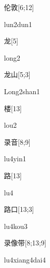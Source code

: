 \begin{verbete}{伦敦}[6;12]
\begin{pronuncia}{lun2dun1}
\end{pronuncia}
\end{verbete}

\begin{verbete}[long2]{龙}[5]
\begin{pronuncia}{long2}
\end{pronuncia}
\end{verbete}

\begin{verbete}{龙山}[5;3]
\begin{pronuncia}{Long2shan1}
\end{pronuncia}
\end{verbete}

\begin{verbete}[lou2]{楼}[13]
\begin{pronuncia}{lou2}
\end{pronuncia}
\end{verbete}

\begin{verbete}[lu4yin1]{录音}[8;9]
\begin{pronuncia}{lu4yin1}
\end{pronuncia}
\end{verbete}

\begin{verbete}[lu4]{路}[13]
\begin{pronuncia}{lu4}
\end{pronuncia}
\end{verbete}

\begin{verbete}[lu4kou3]{路口}[13;3]
\begin{pronuncia}{lu4kou3}
\end{pronuncia}
\end{verbete}

\begin{verbete}{录像带}[8;13;9]
\begin{pronuncia}{lu4xiang4dai4}
\end{pronuncia}
\end{verbete}

